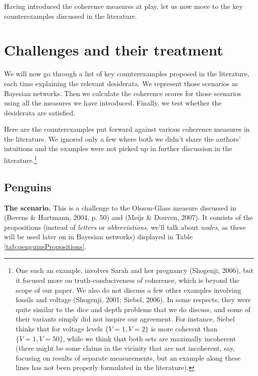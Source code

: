 \documentclass[
  10pt,
]{scrartcl}
\begin{document}
\vspace{2mm}

\noindent Having introduced the coherence measures at play, let us now move to the key counterexamples discussed in the literature.

\hypertarget{challenges-and-their-treatment}{%
\section{\texorpdfstring{Challenges and their treatment \label{sec:examples}}{Challenges and their treatment }}\label{challenges-and-their-treatment}}

We will now go through a list of key counterexamples proposed in the literature, each time explaining the relevant desiderata. We represent those scenarios as Bayesian networks. Then we calculate the coherence scores for those scenarios using all the measures we have introduced. Finally, we test whether the desiderata are satisfied.

Here are the counterexamples put forward against various coherence measures in the literature. We ignored only a few where both we didn't share the authors' intuitions and the examples were not picked up in further discussion in the literature.\footnote{One such an example, involves
  Sarah and her pregnancy (Shogenji, 2006), but it focused more
  on truth-conduciveness of coherence, which is beyond the scope of our
  paper. We also do not discuss a few other examples involving fossils
  and voltage (Shogenji, 2001; Siebel, 2006). In some respects,
  they were quite similar to the dice and depth problems that we do
  discuss, and some of their variants simply did not inspire our
  agreement. For instance, Siebel thinks that for voltage levels
  \(\{V=1, V=2\}\) is more coherent than \(\{V=1, V=50\}\), while we
  think that both sets are maximally incoherent (there might be some
  claims in the vicinity that are not incoherent, say, focusing on
  results of separate measurements, but an example along these lines has
  not been properly formulated in the literature).}

\hypertarget{penguins}{%
\subsection{Penguins}\label{penguins}}

\textbf{The scenario.} This is a challenge to the Olsson-Glass measure discussed in (Bovens \& Hartmann, 2004, p. 50) and (Meijs \& Douven, 2007). It consists of the propositions (instead of \emph{letters} or \emph{abbreviations}, we'll talk about \emph{nodes}, as these will be used later on in Bayesian networks) displayed in Table \ref{tab:penguinsPropositions}.
\end{document}
